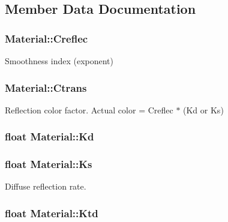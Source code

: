 \subsection{Member Data Documentation}
\subsubsection[{\texorpdfstring{Creflec}{Creflec}}]{ Material\+::\+Creflec}\hypertarget{structMaterial_a9bc38e4305511b6b74a0df019317be0a}{}\label{structMaterial_a9bc38e4305511b6b74a0df019317be0a}


Smoothness index (exponent) 

\subsubsection[{\texorpdfstring{Ctrans}{Ctrans}}]{ Material\+::\+Ctrans}\hypertarget{structMaterial_aca86e404d70ef98b5c1e466c9c20cee3}{}\label{structMaterial_aca86e404d70ef98b5c1e466c9c20cee3}


Reflection color factor. Actual color = Creflec $\ast$ (Kd or Ks) 

\subsubsection[{\texorpdfstring{Kd}{Kd}}]{\setlength{\rightskip}{0pt plus 5cm}float Material\+::\+Kd}\hypertarget{structMaterial_a2db17351a8e462cc446520ae49e64350}{}\label{structMaterial_a2db17351a8e462cc446520ae49e64350}
\subsubsection[{\texorpdfstring{Ks}{Ks}}]{\setlength{\rightskip}{0pt plus 5cm}float Material\+::\+Ks}\hypertarget{structMaterial_acb75581ad97c1df67172d7d7ec59903d}{}\label{structMaterial_acb75581ad97c1df67172d7d7ec59903d}


Diffuse reflection rate. 

\subsubsection[{\texorpdfstring{Ktd}{Ktd}}]{\setlength{\rightskip}{0pt plus 5cm}float Material\+::\+Ktd}\hypertarget{structMaterial_adea51e78c45979bbbb46f04112ea133c}{}\label{structMaterial_adea51e78c45979bbbb46f04112ea133c}


